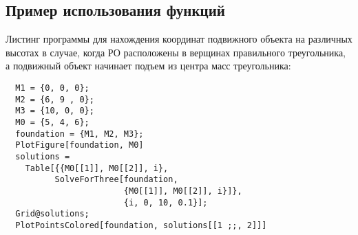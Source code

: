 \documentclass[../main.tex]{subfiles}
\begin{document}
\subsection{Пример использования функций}
Листинг программы для нахождения координат подвижного объекта на различных высотах в случае, когда РО расположены в верщинах правильного треугольника, а подвижный объект начинает подъем из центра масс треугольника:
\begin{lstlisting}
  M1 = {0, 0, 0};
  M2 = {6, 9 , 0};
  M3 = {10, 0, 0};
  M0 = {5, 4, 6};
  foundation = {M1, M2, M3};
  PlotFigure[foundation, M0]
  solutions =
    Table[{{M0[[1]], M0[[2]], i},
          SolveForThree[foundation,
                        {M0[[1]], M0[[2]], i}]},
                        {i, 0, 10, 0.1}];
  Grid@solutions;
  PlotPointsColored[foundation, solutions[[1 ;;, 2]]]
\end{lstlisting}
\end{document}
